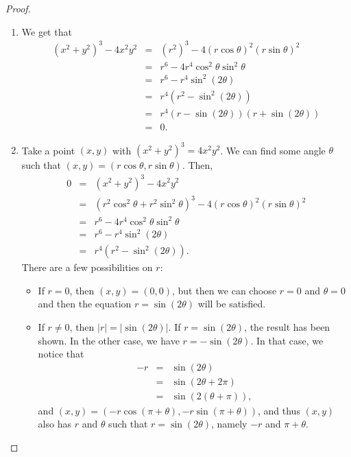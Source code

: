 \begin{proof}
    \begin{enumerate}
        \item We get that
        \begin{eqnarray*}
            (x^2 + y^2)^3 - 4x^2 y^2
            & = & (r^2)^3 - 4(r\cos\theta)^2 (r\sin\theta)^2\\
            & = & r^6 - 4r^4 \cos^2\theta \sin^2\theta\\
            & = & r^6 - r^4 \sin^2(2\theta)\\
            & = & r^4(r^2 - \sin^2(2\theta))\\
            & = & r^4(r-\sin(2\theta))(r+\sin(2\theta))\\
            & = & 0.
        \end{eqnarray*}
        \item Take a point $(x,y)$ with $(x^2 + y^2)^3 = 4x^2y^2$. We can find some angle $\theta$ such that $(x,y) = (r\cos\theta, r\sin\theta)$. Then,
        \begin{eqnarray*}
            0
            & = & (x^2 + y^2)^3 - 4x^2 y^2\\
            & = & (r^2\cos^2\theta + r^2\sin^2\theta)^3 - 4(r\cos\theta)^2 (r\sin\theta)^2\\
            & = & r^6 - 4r^4 \cos^2\theta \sin^2\theta\\
            & = & r^6 - r^4 \sin^2(2\theta)\\
            & = & r^4 (r^2 - \sin^2(2\theta)).
        \end{eqnarray*}
        There are a few possibilities on $r$:
        \begin{itemize}
            \item If $r=0$, then $(x,y) = (0,0)$, but then we can choose $r=0$ and $\theta = 0$ and then the equation $r=\sin(2\theta)$ will be satisfied.
            \item If $r\neq 0$, then $|r| = |\sin(2\theta)|$. If $r = \sin(2\theta)$, the result has been shown. In the other case, we have $r=-\sin(2\theta)$. In that case, we notice that
            \begin{eqnarray*}
                -r
                & = & \sin(2\theta)\\
                & = & \sin(2\theta + 2\pi)\\
                & = & \sin(2(\theta + \pi)),
            \end{eqnarray*}
            and $(x,y) = (-r\cos(\pi + \theta), -r\sin(\pi + \theta))$, and thus $(x,y)$ also has $r$ and $\theta$ such that $r=\sin(2\theta)$, namely $-r$ and $\pi+\theta$.
        \end{itemize}
    \end{enumerate}
\end{proof}

